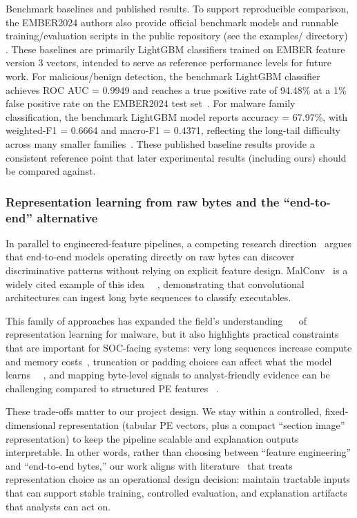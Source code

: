 \documentclass[conference]{IEEEtran}
\begin{document}
Benchmark baselines and published results. To support reproducible comparison, the EMBER2024 authors also provide official benchmark models and runnable training/evaluation scripts in the public repository (see the examples/ directory)~\cite{JMGPR2024} \cite{ember2024github}. These baselines are primarily LightGBM classifiers trained on EMBER feature version 3 vectors, intended to serve as reference performance levels for future work. For malicious/benign detection, the benchmark LightGBM classifier achieves ROC AUC = 0.9949 and reaches a true positive rate of 94.48\% at a 1\% false positive rate on the EMBER2024 test set~\cite{JMGPR2024}. For malware family classification, the benchmark LightGBM model reports accuracy = 67.97\%, with weighted-F1 = 0.6664 and macro-F1 = 0.4371, reflecting the long-tail difficulty across many smaller families~\cite{JMGPR2024}. These published baseline results provide a consistent reference point that later experimental results (including ours) should be compared against.

\subsubsection{Representation learning from raw bytes and the “end-to-end” alternative}

In parallel to engineered-feature pipelines, a competing research direction~\cite{RBSBCN2017} \cite{KBSSSK2025} argues that end-to-end models operating directly on raw bytes can discover discriminative patterns without relying on explicit feature design. MalConv~\cite{RBSBCN2017} is a widely cited example of this idea~\cite{MT2025} ~\cite{EDS2020}, demonstrating that convolutional architectures can ingest long byte sequences to classify executables.

This family of approaches has expanded the field’s understanding~\cite{RCEJH2025} ~\cite{KBSSSK2025} of representation learning for malware, but it also highlights practical constraints that are important for SOC-facing systems: very long sequences increase compute and memory costs~\cite{EDS2020}, truncation or padding choices can affect what the model learns~\cite{RBSBCN2017} ~\cite{AQPWPWCR2022}, and mapping byte-level signals to analyst-friendly evidence can be challenging compared to structured PE features~\cite{NSDSP2025} \cite{AQPWPWCR2022}.

These trade-offs matter to our project design. We stay within a controlled, fixed-dimensional representation (tabular PE vectors, plus a compact “section image” representation) to keep the pipeline scalable and explanation outputs interpretable. In other words, rather than choosing between “feature engineering” and “end-to-end bytes,” our work aligns with literature~\cite{JMGPR2024} \cite{RBSBCN2017} that treats representation choice as an operational design decision: maintain tractable inputs that can support stable training, controlled evaluation, and explanation artifacts that analysts can act on.
\end{document}
